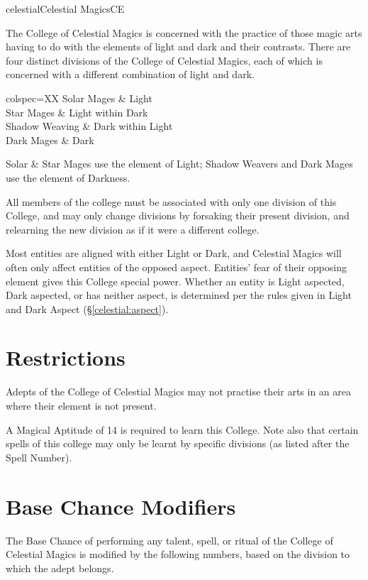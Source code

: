 \begin{College}[1.3]{celestial}{Celestial Magics}{CE}

The College of Celestial Magics is concerned with the practice of
those magic arts having to do with the elements of light and dark and
their contrasts.  There are four distinct divisions of the College of
Celestial Magics, each of which is concerned with a different
combination of light and dark.

\begin{dqtblr}{colspec={XX}}
Solar Mages	& Light \\
Star Mages	& Light within Dark \\
Shadow Weaving	& Dark within Light \\
Dark Mages	& Dark  \\
\end{dqtblr}

Solar \& Star Mages use the element of Light; Shadow Weavers and Dark
Mages use the element of Darkness.

All members of the college must be associated with only one division
of this College, and may only change divisions by forsaking their
present division, and relearning the new division as if it were a
different college.

Most entities are aligned with either Light or Dark, and Celestial
Magics will often only affect entities of the opposed aspect.
Entities’ fear of their opposing element gives this College special
power.  Whether an entity is Light aspected, Dark aspected, or has
neither aspect, is determined per the rules given in Light and Dark
Aspect (\S\ref{celestial:aspect}).

\section{Restrictions}

Adepts of the College of Celestial Magics may not practise their arts
in an area where their element is not present.

A Magical Aptitude of 14 is required to learn this College. Note also
that certain spells of this college may only be learnt by specific
divisions (as listed after the Spell Number).

\section{Base Chance Modifiers}

The Base Chance of performing any talent, spell, or ritual of the
College of Celestial Magics is modified by the following numbers,
based on the division to which the adept belongs.


\end{College}

